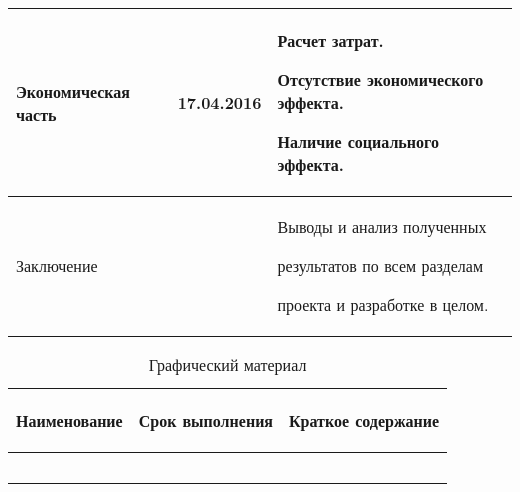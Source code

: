 \begin{table} [h!]
{\begin{tabular}{| m{4.8cm} | c | m{7cm} |}
      Экономическая часть
      & 17.04.2016
      & Расчет затрат. \par
        Отсутствие экономического эффекта. \par
        Наличие социального эффекта. \\
      \hline

      Заключение
      &
      & Выводы и анализ полученных \par
        результатов по всем разделам \par
        проекта и разработке в целом. \\
      \hline
    \end{tabular}
  }
\end{table}

\newpage

\begin{table} [h!]
  \caption{
    Графический материал
  }\label{tbl:plan_graphics}
  \small{
    \begin{tabular}{| m{4.8cm} | c | m{7cm} |}
      \hline
      \begin{center} Наименование \end{center}
      & Срок выполнения
      & \begin{center} Краткое содержание \end{center} \\
      \hline

      & & \\ \hline
      & & \\ \hline
      & & \\ \hline
      & & \\ \hline
      & & \\ \hline

    \end{tabular}
  }
\end{table}

